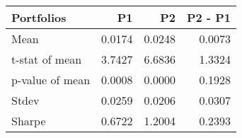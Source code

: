 \begin{tabular}{lrrr}
\toprule
Portfolios & P1 & P2 & P2 - P1 \\
\midrule
Mean & 0.0174 & 0.0248 & 0.0073 \\
t-stat of mean & 3.7427 & 6.6836 & 1.3324 \\
p-value of mean & 0.0008 & 0.0000 & 0.1928 \\
Stdev & 0.0259 & 0.0206 & 0.0307 \\
Sharpe & 0.6722 & 1.2004 & 0.2393 \\
\bottomrule
\end{tabular}
